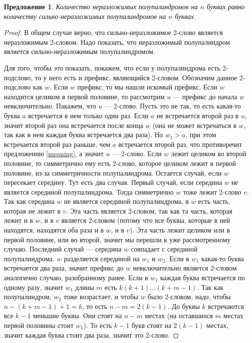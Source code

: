 \documentclass[a4paper,fleqn,12pt,top=0pt]{article}
\theoremstyle{plain}
\newtheorem{proposition}[theorem]{Предложение}
\theoremstyle{definition}
\theoremstyle{remark}
\begin{document}
\begin{proposition}
    Количество неразложимых полупалиндромов на $n$ буквах равно количеству сильно-неразложимых полупалиндромов на $n$ буквах.
\end{proposition}
\begin{proof}
    В общем случае верно, что сильно-неразложимое 2-слово является неразложимым 2-словом. Надо показать, что неразложимый полупалиндром является сильно-неразложимым полупалиндромом.
    
    Для того, чтобы это показать, покажем, что если у полупалиндрома есть 2-подслово, то у него есть и префикс, являющийся 2-словом. Обозначим данное 2-подслово как $w$. Если $w$ префикс, то мы нашли искомый префикс. Если $w$ находится целиком в первой половине, то рассмотрим $u$ --- префикс до начала $w$ невключительно. Пакажем, что $u$ --- 2-слово. Пусть это не так, то есть какая-то буква $a$ встречается в нем только один раз. Если $a$ не встречается второй раз в $u$, значит второй раз она встречается после конца $w$ (она не может встречаться в $w$, так как в нем каждая буква встречается два раза). Но $w_1 > a$, при этом встречается второй раз раньше, чем $a$ встречается второй раз, что противоречит предложению \ref{meaning}, а значит $u$ --- 2-слово. Если $w$ лежит целиком во второй половине, то симметрично ему есть 2-слово, которое целиком лежит в первой половине, из-за симметричности полупалиндрома. Остается случай, если $w$ пересекает середину. Тут есть два случая. Первый случай, если середина $w$ не является серединой полупалиндрома. Тогда симметрично $w$ тоже лежит 2-слово $v$. Так как середина $w$ не является серединой полупалиндрома, в $w$ есть часть, которая не лежит в $v$. Эта часть является 2-словом, так как та часть, которая лежит и в $w$, и в $v$ является 2-словом (потому что все буквы, которые в ней находятся, находятся оба раза и в $w$, и в $v$). Эта часть лежит целиком или в первой половине, или во второй, значит мы перешли к уже рассмотренному случаю. Последний случай --- середина $w$ совпадает с серединой полупалиндрома. $w$ разделяется серединой на $w_1$ и $w_2$. Если в $w_1$ какая-то буква встречается два раза, значит префикс до $w$ невключительно является 2-словом аналогично случаю, разобранному ранее. Если в $w_1$ каждая буква встречается по одному разу, значит $w_1$ длины $m$ есть $k(k+1)\dots(k+m-1)$. Так как полупалиндром, $w_2$ тоже возрастает, и чтобы $w$ было 2-словом, надо, чтобы $n - (k + m - 1) + 1 = k$, то есть $n - m = 2(k - 1)$. До буквы $k$ встречаются все $k - 1$ меньшие буквы. Они стоят на $n - m$ местах (на оставшихся $m$ местах первой половины стоит $w_1$). То есть $k - 1$ букв стоят на $2(k - 1)$ местах, значит каждая буква стоит два раза, значит это 2-слово.
\end{proof}
\end{document}
